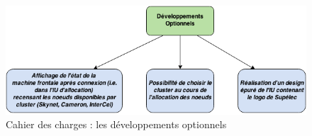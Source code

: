 \begin{figure}[h!]
  \centering
  \includegraphics[width=14cm]{images/points_optionnels.png}
  \caption{Cahier des charges : les développements optionnels}
  \label{fig:pts_optionnels}
\end{figure}



